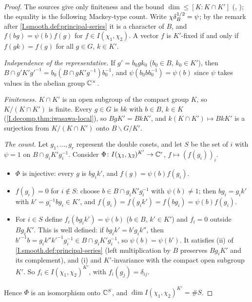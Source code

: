 \begin{theorem}
\end{theorem}
\begin{proof}
The sources give only finiteness and the bound $\dim\le[K:K\cap K']$ (\cite[Theorem~2.4.1\,(d)]{Cas-p},
\cite[§9, p.~54]{BumpH}); the equality is the following Mackey-type count. Write $\chi\delta_B^{1/2}=\psi$; by the remark
after \cref{I.smooth.def:principal-series} it is a character of $B$, and $f(bg)=\psi(b)f(g)$ for $f\in I(\chi_1,\chi_2)$.
A vector $f$ is $K'$-fixed if and only if $f(gk)=f(g)$ for all $g\in G$, $k\in K'$.

\emph{Independence of the representative.} If $g'=b_0gk_0$ ($b_0\in B$, $k_0\in K'$), then
$B\cap g'K'g'^{-1}=b_0(B\cap gK'g^{-1})b_0^{-1}$, and $\psi(b_0bb_0^{-1})=\psi(b)$ since $\psi$ takes values in the abelian
group $\mathbb{C}^\times$.

\emph{Finiteness.} $K\cap K'$ is an open subgroup of the compact group $K$, so $K/(K\cap K')$ is finite. Every $g\in G$ is
$bk$ with $b\in B$, $k\in K$ (\cref{I.decomp.thm:iwasawa-local}), so $BgK'=BkK'$, and $k(K\cap K')\mapsto BkK'$ is a
surjection from $K/(K\cap K')$ onto $B\backslash G/K'$.

\emph{The count.} Let $g_1,\dots,g_r$ represent the double cosets, and let $S$ be the set of $i$ with $\psi=1$ on
$B\cap g_iK'g_i^{-1}$. Consider $\Phi\colon I(\chi_1,\chi_2)^{K'}\to\mathbb{C}^r$, $f\mapsto(f(g_i))_i$.
\begin{itemize}
\item $\Phi$ is injective: every $g$ is $bg_ik'$, and $f(g)=\psi(b)f(g_i)$.
\item $f(g_i)=0$ for $i\notin S$: choose $b\in B\cap g_iK'g_i^{-1}$ with $\psi(b)\neq1$; then $bg_i=g_ik'$ with
  $k'=g_i^{-1}bg_i\in K'$, and $f(g_i)=f(g_ik')=f(bg_i)=\psi(b)f(g_i)$.
\item For $i\in S$ define $f_i(bg_ik')=\psi(b)$ ($b\in B$, $k'\in K'$) and $f_i=0$ outside $Bg_iK'$. This is well defined:
  if $bg_ik'=b'g_ik''$, then $b'^{-1}b=g_ik''k'^{-1}g_i^{-1}\in B\cap g_iK'g_i^{-1}$, so $\psi(b)=\psi(b')$. It satisfies
  (ii) of \cref{I.smooth.def:principal-series} (left multiplication by $B$ preserves $Bg_iK'$ and its complement), and (i)
  and $K'$-invariance with the compact open subgroup $K'$. So $f_i\in I(\chi_1,\chi_2)^{K'}$, with $f_i(g_j)=\delta_{ij}$.
\end{itemize}
Hence $\Phi$ is an isomorphism onto $\mathbb{C}^S$, and $\dim I(\chi_1,\chi_2)^{K'}=\#S$.
\end{proof}

